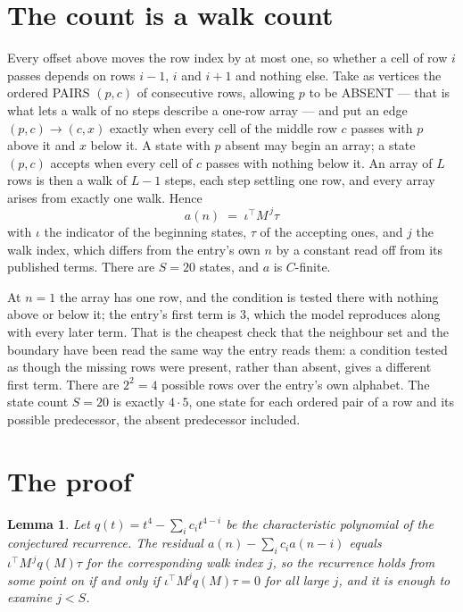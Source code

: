 \documentclass[11pt,a4paper]{article}
\theoremstyle{plain}
\newtheorem{lemma}[theorem]{Lemma}
\theoremstyle{definition}
\begin{document}
\section{The count is a walk count}

Every offset above moves the row index by at most one, so whether a cell of row $i$ passes
depends on rows $i-1$, $i$ and $i+1$ and nothing else. Take as vertices the ordered PAIRS
$(p,c)$ of consecutive rows, allowing $p$ to be ABSENT --- that is what lets a walk of no steps
describe a one-row array --- and put an edge $(p,c)\to(c,x)$ exactly when every cell of the
middle row $c$ passes with $p$ above it and $x$ below it. A state with $p$ absent may begin an
array; a state $(p,c)$ accepts when every cell of $c$ passes with nothing below it. An array of
$L$ rows is then a walk of $L-1$ steps, each step settling one row, and every array arises from
exactly one walk. Hence
\[
a(n)\;=\;\iota^{\!\top}M^{\,j}\tau
\]
with $\iota$ the indicator of the beginning states, $\tau$ of the accepting ones, and $j$ the
walk index, which differs from the entry's own $n$ by a constant read off from its published
terms. There are $S=20$ states, and $a$ is $C$-finite.

At $n=1$ the array has one row, and
the condition is tested there with nothing above or below it; the entry's first term is
$3$, which the model reproduces along with every later term. That is the cheapest check
that the neighbour set and the boundary have been read the same way the entry reads them: a
condition tested as though the missing rows were present, rather than absent, gives a different
first term. There are $2^{2}=4$ possible rows over the entry's own alphabet. The state count $S=20$ is exactly $4\cdot5$,
one state for each ordered pair of a row and its possible predecessor, the absent predecessor
included.

\section{The proof}

\begin{lemma}\label{lem:crit}
Let $q(t)=t^{4}-\sum_i c_it^{4-i}$ be the characteristic polynomial of the
conjectured recurrence. The residual $a(n)-\sum_ic_ia(n-i)$ equals
$\iota^{\!\top}M^{\,j}q(M)\tau$ for the corresponding walk index $j$, so the recurrence
holds from some point on if and only if $\iota^{\!\top}M^{j}q(M)\tau=0$ for all large $j$,
and it is enough to examine $j<S$.
\end{lemma}
\end{document}
